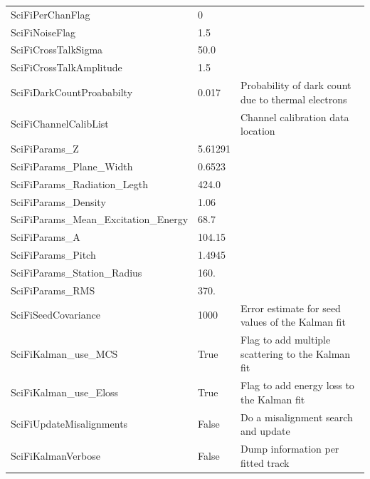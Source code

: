 \begin{tabular}{| l | l | p{8cm} |}
  SciFiPerChanFlag & 0 & \\
  SciFiNoiseFlag & 1.5 & \\
  SciFiCrossTalkSigma & 50.0 & \\
  SciFiCrossTalkAmplitude & 1.5 & \\
  SciFiDarkCountProababilty & 0.017 & Probability of dark count due to thermal electrons \\
  SciFiChannelCalibList & & Channel calibration data location \\
  SciFiParams\_Z & 5.61291 & \\
  SciFiParams\_Plane\_Width & 0.6523 & \\
  SciFiParams\_Radiation\_Legth & 424.0 & \\
  SciFiParams\_Density & 1.06 & \\
  SciFiParams\_Mean\_Excitation\_Energy & 68.7 & \\
  SciFiParams\_A & 104.15 & \\
  SciFiParams\_Pitch & 1.4945 & \\
  SciFiParams\_Station\_Radius & 160. & \\
  SciFiParams\_RMS & 370. & \\
  SciFiSeedCovariance & 1000 & Error estimate for seed values of the Kalman fit \\
  SciFiKalman\_use\_MCS & True & Flag to add multiple scattering to the Kalman fit \\
  SciFiKalman\_use\_Eloss & True & Flag to add energy loss to the Kalman fit \\
  SciFiUpdateMisalignments & False & Do a misalignment search and update \\
  SciFiKalmanVerbose & False & Dump information per fitted track \\
  \hline  
\end{tabular}
\renewcommand{\arraystretch}{1.0}



